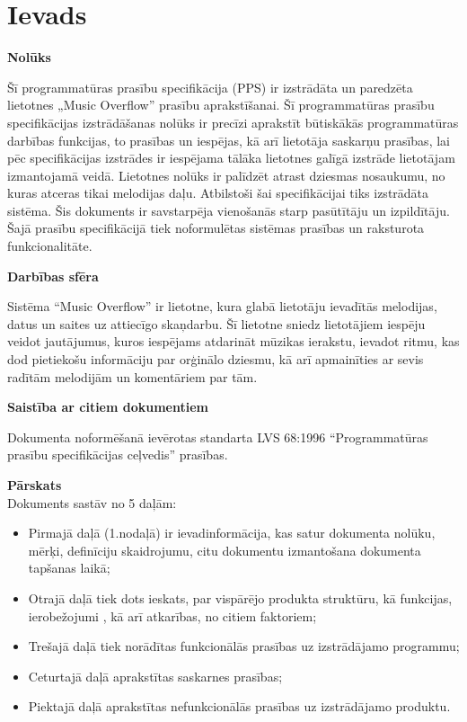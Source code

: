 \documentclass[12pt]{article}
\begin{document}
\pagebreak

\section*{Ievads}

\textbf{Nolūks}

Šī programmatūras prasību specifikācija (PPS) ir izstrādāta un paredzēta lietotnes „Music Overflow” prasību aprakstīšanai.
Šī programmatūras prasību specifikācijas izstrādāšanas nolūks ir precīzi aprakstīt būtiskākās programmatūras darbības funkcijas, to prasības un iespējas, kā arī lietotāja saskarņu prasības, lai pēc specifikācijas izstrādes ir iespējama tālāka lietotnes galīgā izstrāde lietotājam izmantojamā veidā.
Lietotnes nolūks ir palīdzēt atrast dziesmas nosaukumu, no kuras atceras tikai melodijas daļu.
Atbilstoši šai specifikācijai tiks izstrādāta sistēma. Šis dokuments ir savstarpēja vienošanās starp pasūtītāju un izpildītāju. Šajā prasību specifikācijā tiek noformulētas sistēmas prasības un raksturota funkcionalitāte.



\textbf{Darbības sfēra}

Sistēma ``Music Overflow'' ir lietotne, kura glabā lietotāju ievadītās melodijas, datus un saites uz attiecīgo skaņdarbu. Šī lietotne sniedz lietotājiem iespēju veidot jautājumus, kuros iespējams atdarināt mūzikas ierakstu, ievadot ritmu, kas dod pietiekošu informāciju par orģinālo dziesmu, kā arī apmainīties ar sevis radītām melodijām un komentāriem par tām.


\textbf{Saistība ar citiem dokumentiem}

Dokumenta noformēšanā ievērotas standarta LVS 68:1996 ``Programmatūras prasību specifikācijas ceļvedis'' prasības.

\textbf{Pārskats}\\
Dokuments sastāv no 5 daļām:
\begin{itemize}
\item Pirmajā daļā (1.nodaļā) ir ievadinformācija, kas satur dokumenta nolūku, mērķi, definīciju skaidrojumu, citu dokumentu izmantošana dokumenta tapšanas laikā;
\item Otrajā daļā tiek dots ieskats, par vispārējo produkta struktūru, kā funkcijas, ierobežojumi , kā arī atkarības, no citiem faktoriem;
\item Trešajā daļā tiek norādītas funkcionālās prasības uz izstrādājamo programmu;
\item Ceturtajā daļā aprakstītas saskarnes prasības;
\item Piektajā daļā aprakstītas nefunkcionālās prasības uz izstrādājamo produktu.
\end{itemize}
\end{document}
